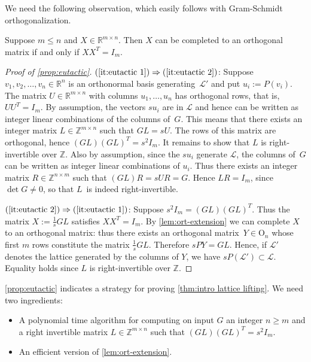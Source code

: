 \documentclass[a4paper,USenglish,cleveref,numberwithinsect]{lipics-v2021}
\newcommand{\QQ}{\mathbb{Q}}
\newcommand{\ZZ}{\mathbb{Z}}
\newcommand{\RR}{\mathbb{R}}
\numberwithin{equation}{section}
\begin{document}
We need the following observation, which easily follows with
Gram-Schmidt orthogonalization.

\begin{lemma}\label{lem:ort-extension}
Suppose $m\leq n$ and $X\in\RR^{m\times n}$.
Then $X$ can be completed to an orthogonal matrix if and only if $XX^T=I_m$.
\end{lemma}

\begin{proof}[Proof of \cref{prop:eutactic}]
$(\ref{it:eutactic 1})\Rightarrow(\ref{it:eutactic 2})$:
Suppose $v_1,v_2,\dots,v_n\in\RR^n$ is an orthonormal basis
generating~$\mathcal{L}'$ and put $u_i := P(v_i)$.
The matrix $U\in\RR^{m\times n}$ with columns  $u_1,\ldots, u_n$ has orthogonal rows, that is, $UU^T = I_m$.
By assumption, the vectors $s u_i$ are in $\mathcal{L}$ and hence
can be written as integer linear combinations of the columns of~$G$.
This means that there exists an integer matrix $L\in\ZZ^{m\times n}$ such that
$G L =s U$.
The rows of this matrix are orthogonal, hence $(GL)(GL)^T = s^2 I_m$.
It remains to show that $L$ is right-invertible over $\ZZ$.
Also by assumption, since the $s u_i$ generate $\mathcal{L}$,
the columns of~$G$ can be written as integer linear combinations of $u_i$.
Thus there exists an integer matrix $R\in\ZZ^{n\times m}$ such that $(GL)R=sUR=G$.
Hence $LR=I_m$, since $\det G\neq 0$, so that $L$~is indeed right-invertible.

$(\ref{it:eutactic 2})\Rightarrow(\ref{it:eutactic 1})$:
Suppose $s^2 I_m=(GL)(GL)^T$. Thus the matrix
$X := \frac{1}{s}GL$ satisfies $XX^T=I_m$.
By \cref{lem:ort-extension} we can complete $X$ to an orthogonal matrix:
thus there exists an orthogonal matrix~$Y\in\mathrm{O}_n$
whose first $m$ rows constitute the matrix $\frac{1}{s}GL$.
Therefore $s PY=GL$. Hence, if $\mathcal{L}'$ denotes the lattice generated by the columns of $Y$,
we have $s P(\mathcal{L}')\subset\mathcal{L}$.
Equality holds since $L$ is right-invertible over $\ZZ$.
\end{proof}

\cref{prop:eutactic} indicates a strategy for proving \cref{thm:intro lattice lifting}.
We need two ingredients:

\begin{itemize}
\item A polynomial time algorithm for computing on input $G$
 an integer $n\geq m$ and a right invertible matrix
 $L\in\ZZ^{m\times n}$ such that $(GL)(GL)^T=s^2 I_m$.

\item An efficient version of \cref{lem:ort-extension}.
\end{itemize}
\end{document}
